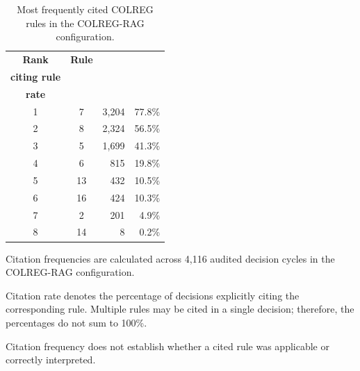 \documentclass[10pt]{reportMaster}
\begin{document}
\begin{table}[t]
\centering
\caption{Most frequently cited COLREG rules in the
COLREG-RAG configuration.}
\label{tab:imazu-colreg-citation-frequency}
\begin{threeparttable}

\small
\setlength{\tabcolsep}{8pt}
\renewcommand{\arraystretch}{1.15}

\begin{tabular}{@{}c c r r@{}}
\toprule
\textbf{Rank}
& \textbf{Rule}
& \shortstack{\textbf{Decisions}\\
\textbf{citing rule}}
& \shortstack{\textbf{Citation}\\
\textbf{rate}} \\
\midrule

1 & 7  & 3,204 & 77.8\% \\

2 & 8  & 2,324 & 56.5\% \\

3 & 5  & 1,699 & 41.3\% \\

4 & 6  & 815   & 19.8\% \\

5 & 13 & 432   & 10.5\% \\

6 & 16 & 424   & 10.3\% \\

7 & 2  & 201   & 4.9\% \\

8 & 14 & 8     & 0.2\% \\

\bottomrule
\end{tabular}

\begin{tablenotes}[flushleft]
\footnotesize
\item Citation frequencies are calculated across
4,116 audited decision cycles in the COLREG-RAG
configuration.
\item Citation rate denotes the percentage of
decisions explicitly citing the corresponding rule.
Multiple rules may be cited in a single decision;
therefore, the percentages do not sum to 100\%.
\item Citation frequency does not establish
whether a cited rule was applicable or
correctly interpreted.
\end{tablenotes}

\end{threeparttable}
\end{table}
\end{document}
